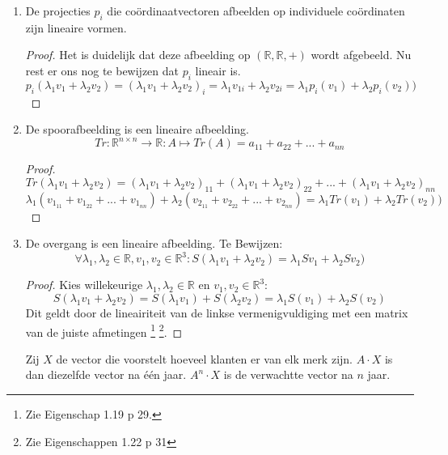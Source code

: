 \documentclass[lineaire_algebra_oplossingen.tex]{subfiles}
\begin{document}
\begin{enumerate}
\begin{itemize}
\begin{proof}
\[
f(\lambda_1v_1+\lambda_2v_2) = (a\lambda_1v_{1x}+b\lambda_1(v_{1y})+(a\lambda_2v_{2x}+b\lambda_2v_{2y})
\]
\[
= \lambda_1(av_{1x}+bv_{1y})+\lambda_2(av_{2x}+bv_{2y}) = \lambda_1f(v_1)+\lambda_2f(v_2))
\]
\end{proof}
\item De volgende afbeelding is niet lineair
\[g: \mathbb{R}^2 \rightarrow \mathbb{R}: (x,y) \mapsto ax+by+c\]
\begin{proof}
De nulvector $\vec{0}$ wordt niet op zichzelf afgebeeld maar op $c$.
\end{proof}
\end{itemize}
\item De projecties $p_i$ die co\"ordinaatvectoren afbeelden op individuele co\"ordinaten zijn lineaire vormen.
\begin{proof}
Het is duidelijk dat deze afbeelding op $(\mathbb{R},\mathbb{R},+)$ wordt afgebeeld. Nu rest er ons nog te bewijzen dat $p_i$ lineair is.
\[
p_i(\lambda_1v_1+\lambda_2v_2) = (\lambda_1v_1+\lambda_2v_2)_i
= \lambda_1v_{1i}+\lambda_2v_{2i} = \lambda_1p_i(v_1)+\lambda_2p_i(v_2))
\]
\end{proof}
\item De spoorafbeelding is een lineaire afbeelding.
\[
Tr:\mathbb{R}^{n\times n}\rightarrow \mathbb{R}:A\mapsto Tr(A)=a_{11}+a_{22}+...+a_{nn}
\]
\begin{proof}
\[
Tr(\lambda_1v_1+\lambda_2v_2) = (\lambda_1v_1+\lambda_2v_2)_{11}+(\lambda_1v_1+\lambda_2v_2)_{22}+...+(\lambda_1v_1+\lambda_2v_2)_{nn}
\]
\[
\lambda_1 (v_{1_{11}}+v_{1_{22}}+...+v_{1_{nn}}) + \lambda_2 (v_{2_{11}}+v_{2_{22}}+...+v_{2_{nn}}) = \lambda_1Tr(v_1)+\lambda_2Tr(v_2))
\]
\end{proof}
\item De overgang is een lineaire afbeelding.
Te Bewijzen:
\[
\forall \lambda_1, \lambda_2 \in \mathbb{R}, v_1,v_2 \in \mathbb{R}^3: S(\lambda_1v_1+\lambda_2v_2) = \lambda_1 S v_1+\lambda_2Sv_2)
\]
\begin{proof}
Kies willekeurige $\lambda_1, \lambda_2 \in \mathbb{R}$ en $v_1,v_2 \in \mathbb{R}^3$:
\[
S(\lambda_1v_1+\lambda_2v_2)
= S(\lambda_1v_1)+S(\lambda_2v_2)
= \lambda_1 S (v_1)+\lambda_2S(v_2)
\]
Dit geldt door de lineairiteit van de linkse vermenigvuldiging met een matrix van de juiste afmetingen \footnote{Zie Eigenschap 1.19 p 29.} \footnote{Zie Eigenschappen 1.22 p 31}.
\end{proof}

Zij $X$ de vector die voorstelt hoeveel klanten er van elk merk zijn.
$A\cdot X$ is dan diezelfde vector na \'e\'en jaar. $A^n\cdot X$ is de verwachtte vector na $n$ jaar.


\end{enumerate}
\end{document}
